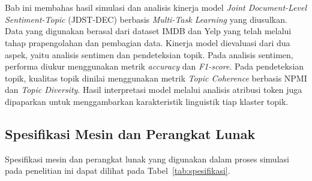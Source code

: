 \chapter{\babEmpat}

Bab ini membahas hasil simulasi dan analisis kinerja model \textit{Joint
Document-Level Sentiment-Topic} (JDST-DEC) berbasis \textit{Multi-Task
Learning} yang diusulkan. Data yang digunakan berasal dari dataset IMDB dan Yelp yang telah melalui
tahap prapengolahan dan pembagian data. Kinerja model dievaluasi dari dua
aspek, yaitu analisis sentimen dan pendeteksian topik. Pada analisis
sentimen, performa diukur menggunakan metrik \textit{accuracy} dan 
\textit{F1-score}. Pada pendeteksian topik, kualitas topik dinilai menggunakan metrik
\textit{Topic Coherence} berbasis NPMI dan \textit{Topic Diversity}.
Hasil interpretasi model melalui analisis atribusi token juga dipaparkan
untuk menggambarkan karakteristik linguistik tiap klaster topik.

\section{Spesifikasi Mesin dan Perangkat Lunak}

Spesifikasi mesin dan perangkat lunak yang digunakan dalam proses simulasi
pada penelitian ini dapat dilihat pada Tabel~\ref{tab:spesifikasi}.

